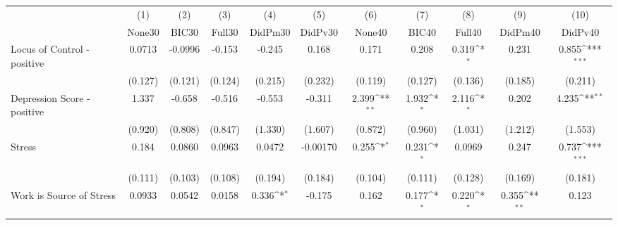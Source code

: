 {
\def\sym#1{\ifmmode^{#1}\else\(^{#1}\)\fi}
\begin{tabular}{l*{10}{c}}
\toprule
            &\multicolumn{1}{c}{(1)}&\multicolumn{1}{c}{(2)}&\multicolumn{1}{c}{(3)}&\multicolumn{1}{c}{(4)}&\multicolumn{1}{c}{(5)}&\multicolumn{1}{c}{(6)}&\multicolumn{1}{c}{(7)}&\multicolumn{1}{c}{(8)}&\multicolumn{1}{c}{(9)}&\multicolumn{1}{c}{(10)}\\
            &\multicolumn{1}{c}{None30}&\multicolumn{1}{c}{BIC30}&\multicolumn{1}{c}{Full30}&\multicolumn{1}{c}{DidPm30}&\multicolumn{1}{c}{DidPv30}&\multicolumn{1}{c}{None40}&\multicolumn{1}{c}{BIC40}&\multicolumn{1}{c}{Full40}&\multicolumn{1}{c}{DidPm40}&\multicolumn{1}{c}{DidPv40}\\
\midrule
Locus of Control - positive&      0.0713         &     -0.0996         &      -0.153         &      -0.245         &       0.168         &       0.171         &       0.208         &       0.319\sym{*}  &       0.231         &       0.855\sym{***}\\
            &     (0.127)         &     (0.121)         &     (0.124)         &     (0.215)         &     (0.232)         &     (0.119)         &     (0.127)         &     (0.136)         &     (0.185)         &     (0.211)         \\
\addlinespace
Depression Score - positive&       1.337         &      -0.658         &      -0.516         &      -0.553         &      -0.311         &       2.399\sym{**} &       1.932\sym{*}  &       2.116\sym{*}  &       0.202         &       4.235\sym{**} \\
            &     (0.920)         &     (0.808)         &     (0.847)         &     (1.330)         &     (1.607)         &     (0.872)         &     (0.960)         &     (1.031)         &     (1.212)         &     (1.553)         \\
\addlinespace
Stress      &       0.184         &      0.0860         &      0.0963         &      0.0472         &    -0.00170         &       0.255\sym{*}  &       0.231\sym{*}  &      0.0969         &       0.247         &       0.737\sym{***}\\
            &     (0.111)         &     (0.103)         &     (0.108)         &     (0.194)         &     (0.184)         &     (0.104)         &     (0.111)         &     (0.128)         &     (0.169)         &     (0.181)         \\
\addlinespace
Work is Source of Stress&      0.0933         &      0.0542         &      0.0158         &       0.336\sym{*}  &      -0.175         &       0.162         &       0.177\sym{*}  &       0.220\sym{*}  &       0.355\sym{**} &       0.123         \\

\end{tabular}}
